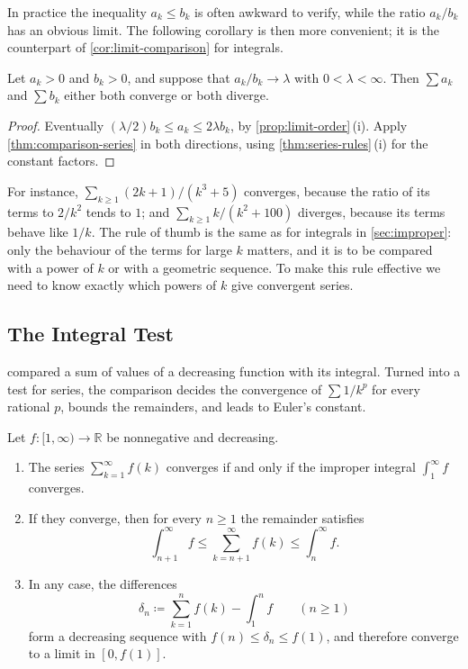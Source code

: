 In practice the inequality $a_k\le b_k$ is often awkward to verify, while the ratio $a_k/b_k$ has an obvious limit. The following corollary is then more convenient; it is the counterpart of \cref{cor:limit-comparison} for integrals.

\begin{corollary}
\label{cor:limit-comparison-series}
Let $a_k>0$ and $b_k>0$, and suppose that $a_k/b_k\to\lambda$ with $0<\lambda<\infty$. Then $\sum a_k$ and $\sum b_k$ either both converge or both diverge.
\end{corollary}

\begin{proof}
Eventually $(\lambda/2)b_k\le a_k\le2\lambda b_k$, by \cref{prop:limit-order}\,(i). Apply \cref{thm:comparison-series} in both directions, using \cref{thm:series-rules}\,(i) for the constant factors.
\end{proof}

For instance, $\sum_{k\ge1}(2k+1)/(k^3+5)$ converges, because the ratio of its terms to $2/k^2$ tends to $1$; and $\sum_{k\ge1}k/(k^2+100)$ diverges, because its terms behave like $1/k$. The rule of thumb is the same as for integrals in \cref{sec:improper}: only the behaviour of the terms for large $k$ matters, and it is to be compared with a power of $k$ or with a geometric sequence. To make this rule effective we need to know exactly which powers of $k$ give convergent series.

\subsection{The Integral Test}

 compared a sum of values of a decreasing function with its integral. Turned into a test for series, the comparison decides the convergence of $\sum1/k^p$ for every rational $p$, bounds the remainders, and leads to Euler's constant.

\begin{theorem}
\label{thm:integral-test}
Let $f\colon[1,\infty)\to\mathbb R$ be nonnegative and decreasing.
\begin{enumerate}
\item The series $\sum_{k=1}^\infty f(k)$ converges if and only if the improper integral $\int_1^\infty f$ converges.
\item If they converge, then for every $n\ge1$ the remainder satisfies
\[
\int_{n+1}^\infty f\le\sum_{k=n+1}^\infty f(k)\le\int_n^\infty f .
\]
\item In any case, the differences
\[
\delta_n\coloneqq\sum_{k=1}^nf(k)-\int_1^nf\qquad(n\ge1)
\]
form a decreasing sequence with $f(n)\le\delta_n\le f(1)$, and therefore converge to a limit in $[0,f(1)]$.
\end{enumerate}
\end{theorem}

